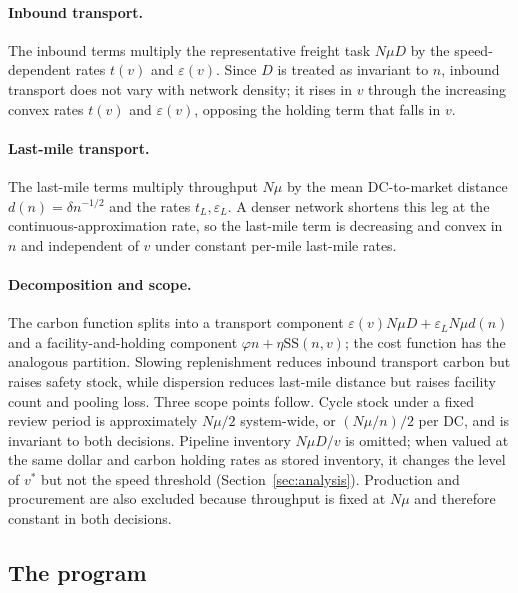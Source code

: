 \documentclass[11pt]{article}
\theoremstyle{definition}
\theoremstyle{remark}
\theoremstyle{plain}
\newcommand{\sstock}{\mathrm{SS}}
\begin{document}
\paragraph{Inbound transport.} The inbound terms multiply the representative freight task $N\mu D$ by the
speed-dependent rates $t(v)$ and $\varepsilon(v)$. Since $D$ is treated as invariant to $n$, inbound transport
does not vary with network density; it rises in $v$ through the increasing convex rates
$t(v)$ and $\varepsilon(v)$, opposing the holding term that falls in $v$.

\paragraph{Last-mile transport.} The last-mile terms multiply throughput $N\mu$ by the mean DC-to-market
distance $d(n)=\delta n^{-1/2}$ and the rates $t_L,\varepsilon_L$. A denser network shortens this leg at the
continuous-approximation rate, so the last-mile term is decreasing and convex in $n$ and independent of $v$
under constant per-mile last-mile rates.

\paragraph{Decomposition and scope.} The carbon function splits into a transport component
$\varepsilon(v)N\mu D+\varepsilon_LN\mu d(n)$ and a facility-and-holding component $\varphi n+\eta\sstock(n,v)$;
the cost function has the analogous partition. Slowing replenishment reduces inbound transport carbon but
raises safety stock, while dispersion reduces last-mile distance but raises facility count and pooling loss.
Three scope points follow. Cycle stock under a fixed review period is approximately $N\mu/2$ system-wide, or
$(N\mu/n)/2$ per DC, and is invariant to both decisions. Pipeline inventory $N\mu D/v$ is omitted; when valued
at the same dollar and carbon holding rates as stored inventory, it changes the level of $v^*$ but not the
speed threshold (Section~\ref{sec:analysis}). Production and procurement are also excluded because throughput
is fixed at $N\mu$ and therefore constant in both decisions.

\subsection{The program}
\end{document}
